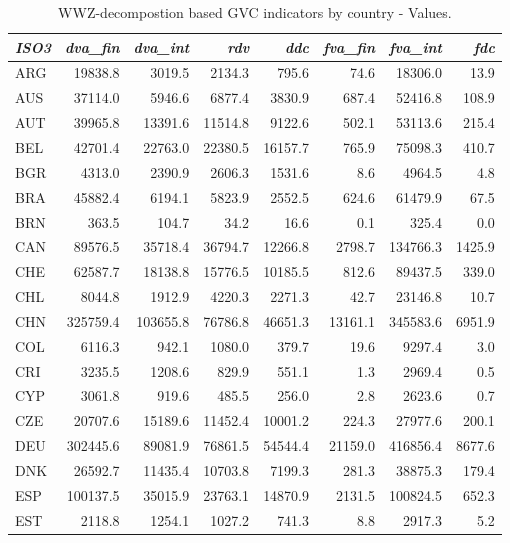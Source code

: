 \documentclass[a4paper,11pt]{article}
\begin{document}
\begin{table}[h]\small
  \centering
       \caption{WWZ-decompostion based GVC indicators by country - Values.}
    \begin{tabular}{lrrrrrrr}
    \toprule
        \textit{ISO3} & \textit{dva\_fin} & \textit{dva\_int} & \textit{rdv} & \textit{ddc} & \textit{fva\_fin} & \textit{fva\_int} & \textit{fdc} \\
    \midrule    
    ARG   & 19838.8 & 3019.5 & 2134.3 & 795.6 & 74.6  & 18306.0 & 13.9 \\
    AUS   & 37114.0 & 5946.6 & 6877.4 & 3830.9 & 687.4 & 52416.8 & 108.9 \\
    AUT   & 39965.8 & 13391.6 & 11514.8 & 9122.6 & 502.1 & 53113.6 & 215.4 \\
    BEL   & 42701.4 & 22763.0 & 22380.5 & 16157.7 & 765.9 & 75098.3 & 410.7 \\
    BGR   & 4313.0 & 2390.9 & 2606.3 & 1531.6 & 8.6   & 4964.5 & 4.8 \\
    BRA   & 45882.4 & 6194.1 & 5823.9 & 2552.5 & 624.6 & 61479.9 & 67.5 \\
    BRN   & 363.5 & 104.7 & 34.2  & 16.6  & 0.1   & 325.4 & 0.0 \\
    CAN   & 89576.5 & 35718.4 & 36794.7 & 12266.8 & 2798.7 & 134766.3 & 1425.9 \\
    CHE   & 62587.7 & 18138.8 & 15776.5 & 10185.5 & 812.6 & 89437.5 & 339.0 \\
    CHL   & 8044.8 & 1912.9 & 4220.3 & 2271.3 & 42.7  & 23146.8 & 10.7 \\
    CHN   & 325759.4 & 103655.8 & 76786.8 & 46651.3 & 13161.1 & 345583.6 & 6951.9 \\
    COL   & 6116.3 & 942.1 & 1080.0 & 379.7 & 19.6  & 9297.4 & 3.0 \\
    CRI   & 3235.5 & 1208.6 & 829.9 & 551.1 & 1.3   & 2969.4 & 0.5 \\
    CYP   & 3061.8 & 919.6 & 485.5 & 256.0 & 2.8   & 2623.6 & 0.7 \\
    CZE   & 20707.6 & 15189.6 & 11452.4 & 10001.2 & 224.3 & 27977.6 & 200.1 \\
    DEU   & 302445.6 & 89081.9 & 76861.5 & 54544.4 & 21159.0 & 416856.4 & 8677.6 \\
    DNK   & 26592.7 & 11435.4 & 10703.8 & 7199.3 & 281.3 & 38875.3 & 179.4 \\
    ESP   & 100137.5 & 35015.9 & 23763.1 & 14870.9 & 2131.5 & 100824.5 & 652.3 \\
    EST   & 2118.8 & 1254.1 & 1027.2 & 741.3 & 8.8   & 2917.3 & 5.2 \\

\end{tabular}
\end{table}
\end{document}
